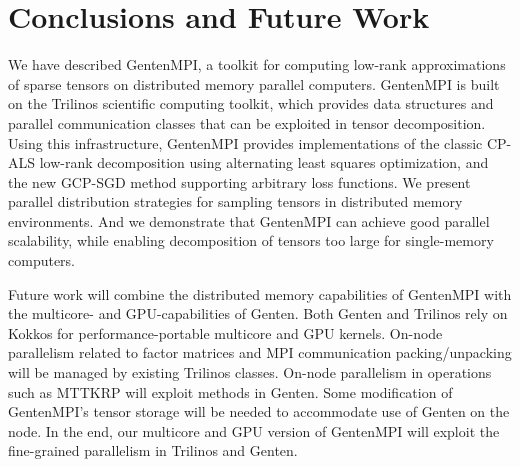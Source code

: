 \chapter{Conclusions and Future Work} \label{sec:conc}

We have described GentenMPI, a toolkit for computing low-rank approximations
of sparse tensors on distributed memory parallel computers.  GentenMPI is built 
on the Trilinos scientific computing toolkit, which provides data structures
and parallel communication classes that can be exploited in tensor 
decomposition.  Using this infrastructure, GentenMPI provides implementations
of the classic CP-ALS low-rank decomposition using alternating least squares
optimization, and the new GCP-SGD method supporting arbitrary loss functions.
We present parallel distribution strategies for sampling tensors in 
distributed memory environments.  And we demonstrate that GentenMPI can achieve 
good parallel scalability, while enabling decomposition of tensors too large
for single-memory computers.

Future work will combine the distributed memory capabilities of GentenMPI with
the multicore- and GPU-capabilities of Genten.  Both Genten and Trilinos rely
on Kokkos for performance-portable multicore and GPU kernels.  On-node
parallelism related to factor matrices and MPI communication packing/unpacking
will be managed by existing Trilinos classes.  On-node parallelism in 
operations such as MTTKRP will exploit methods in Genten.  Some modification
of GentenMPI's tensor storage will be needed to accommodate use of Genten
on the node.  In the end, our
multicore and GPU version of GentenMPI will exploit the fine-grained
parallelism in Trilinos and Genten.

